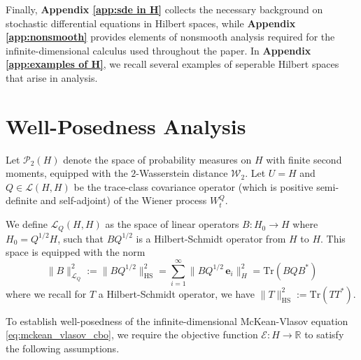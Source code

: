 \documentclass[12pt]{amsart}
\numberwithin{equation}{section}
\begin{document}
Finally, \textbf{Appendix \ref{app:sde in H}} collects the necessary background on stochastic differential equations in Hilbert spaces, while \textbf{Appendix \ref{app:nonsmooth}} provides elements of nonsmooth analysis required for the infinite-dimensional calculus used throughout the paper. In \textbf{Appendix \ref{app:examples of H}}, we recall several examples of seperable Hilbert spaces that arise in analysis.




\section{Well-Posedness Analysis} 
\label{sec:wellposedness}



Let $\mathscr{P}_{2}(H)$ denote the space of probability measures on $H$ with finite second moments, equipped with the $2$-Wasserstein distance $\mathcal{W}_2$. Let $U=H$ and $Q\in \mathscr{L}(H,H)$ be the trace-class covariance operator (which is positive semi-definite and self-adjoint) of the Wiener process $W_t^Q$.

We define $\mathscr{L}_Q(H, H)$ %
as the space of linear operators $B: H_0 \to H$ where $H_0 = Q^{1/2}H$, such that $B Q^{1/2}$ is a Hilbert-Schmidt operator from $H$ to $H$. This space is equipped with the norm
\begin{equation}
    \|B\|_{\mathscr{L}_Q}^2:= \|B Q^{1/2}\|_{\text{HS}}^2=\sum_{i=1}^\infty\|B Q^{1/2}\,\mathbf{e}_i\|_H^2 = \mathrm{Tr}(B Q B^*)
\end{equation}
where we recall for $T$ a Hilbert-Schmidt operator, we have $\|T\|_{\text{HS}}^{2} := \mathrm{Tr}(TT^*)$.

To establish well-posedness of the infinite-dimensional McKean-Vlasov equation \eqref{eq:mckean_vlasov_cbo}, we require the objective function $\mathscr{E}:H\to \mathbb{R}$ to satisfy the following assumptions.
\end{document}
